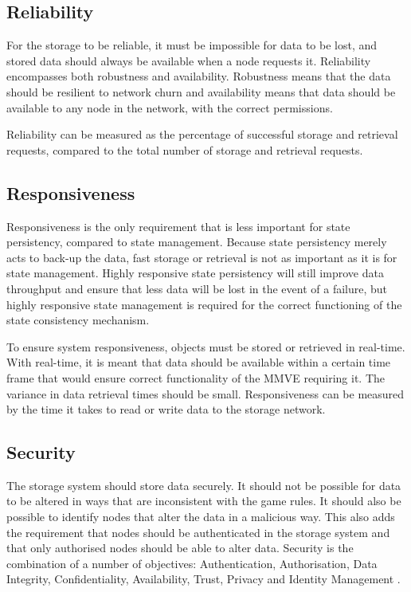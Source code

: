 \subsection{Reliability}

For the storage to be reliable, it must be impossible for data to be lost, and stored data should always be available when a node requests it.
Reliability encompasses both robustness and availability. Robustness means that the data should be resilient to network churn and availability means
that data should be available to any node in the network, with the correct permissions.

Reliability can be measured as the percentage of successful storage and retrieval requests, compared to the total number of storage and retrieval requests.

\subsection{Responsiveness}
\label{char_responsiveness}

Responsiveness is the only requirement that is less important for state persistency, compared to state management. Because state persistency merely acts to back-up the data, fast storage or retrieval is not as important as it is for state management. Highly responsive state persistency will still improve data throughput and ensure that less data will be lost in the event of a failure, but highly responsive state management is required for the correct functioning of the state consistency mechanism.

To ensure system responsiveness, objects must be stored or retrieved in real-time. With real-time, it is meant that data should be available within a
certain time frame that would ensure correct functionality of the MMVE requiring it. The variance in data retrieval times should be small. Responsiveness can be measured by the time it takes to read or write data to the storage network.

\subsection{Security}
\label{characteristics_security}

The storage system should store data securely. It should not be possible for data to be altered in ways that are inconsistent with the game rules. It
should also be possible to identify nodes that alter the data in a malicious way. This also adds the requirement that nodes should be authenticated
in the storage system and that only authorised nodes should be able to alter data. Security is the combination of a number of objectives:
Authentication, Authorisation, Data Integrity, Confidentiality, Availability, Trust, Privacy and Identity Management
\cite{distributed_systems_security}.

